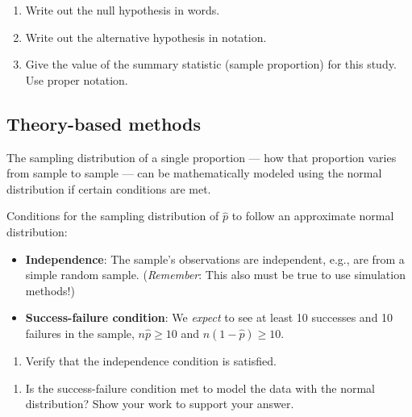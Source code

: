 \documentclass[
]{report}
\providecommand{\tightlist}{%
  \setlength{\itemsep}{0pt}\setlength{\parskip}{0pt}}
\begin{document}
\vspace{0.8in}

\begin{enumerate}
\def\labelenumi{\arabic{enumi}.}
\setcounter{enumi}{1}
\item
  Write out the null hypothesis in words.
  \vspace{0.8in}
\item
  Write out the alternative hypothesis in notation.
  \vspace{0.3in}
\item
  Give the value of the summary statistic (sample proportion) for this study. Use proper notation.
\end{enumerate}

\vspace{0.3in}

\hypertarget{theory-based-methods}{%
\subsection*{Theory-based methods}\label{theory-based-methods}}

The sampling distribution of a single proportion --- how that proportion varies from sample to sample --- can be mathematically modeled using the normal distribution if certain conditions are met.

Conditions for the sampling distribution of \(\hat{p}\) to follow an approximate normal distribution:

\begin{itemize}
\item
  \textbf{Independence}: The sample's observations are independent, e.g., are from a simple random sample. (\emph{Remember}: This also must be true to use simulation methods!)
\item
  \textbf{Success-failure condition}: We \emph{expect} to see at least 10 successes and 10 failures in the sample, \(n\hat{p}≥10\) and \(n(1-\hat{p})≥10\).
\end{itemize}

\begin{enumerate}
\def\labelenumi{\arabic{enumi}.}
\setcounter{enumi}{4}
\tightlist
\item
  Verify that the independence condition is satisfied.
\end{enumerate}

\vspace{0.5in}

\begin{enumerate}
\def\labelenumi{\arabic{enumi}.}
\setcounter{enumi}{5}
\tightlist
\item
  Is the success-failure condition met to model the data with the normal distribution? Show your work to support your answer.
\end{enumerate}
\end{document}
